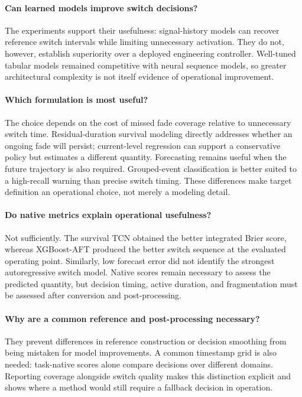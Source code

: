 \paragraph{Can learned models improve switch decisions?}
The experiments support their usefulness: signal-history models can recover
reference switch intervals while limiting unnecessary activation. They do not,
however, establish superiority over a deployed engineering controller.
Well-tuned tabular models remained competitive with neural sequence models,
so greater architectural complexity is not itself evidence of operational
improvement.

\paragraph{Which formulation is most useful?}
The choice depends on the cost of missed fade coverage relative to unnecessary
switch time. Residual-duration survival modeling directly addresses whether an
ongoing fade will persist; current-level regression can support a conservative
policy but estimates a different quantity. Forecasting remains useful when
the future trajectory is also required. Grouped-event classification is better
suited to a high-recall warning than precise switch timing. These differences
make target definition an operational choice, not merely a modeling detail.

\paragraph{Do native metrics explain operational usefulness?}
Not sufficiently. The survival TCN obtained the better integrated Brier score,
whereas XGBoost-AFT produced the better switch sequence at the evaluated
operating point. Similarly, low forecast error did not identify the strongest
autoregressive switch model. Native scores remain necessary to assess the
predicted quantity, but decision timing, active duration, and fragmentation
must be assessed after conversion and post-processing.

\paragraph{Why are a common reference and post-processing necessary?}
They prevent differences in reference construction or decision smoothing from
being mistaken for model improvements. A common timestamp grid is also needed:
task-native scores alone compare decisions over different domains. Reporting
coverage alongside switch quality makes this distinction explicit and shows
where a method would still require a fallback decision in operation.

